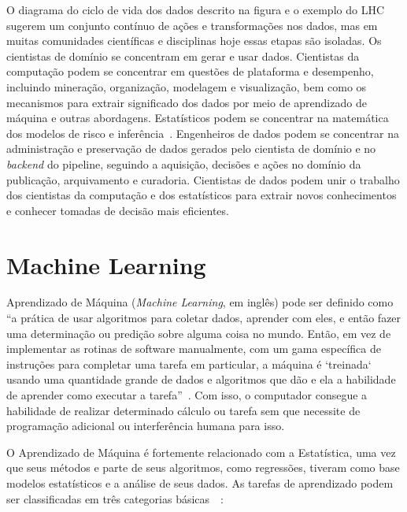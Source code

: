 \documentclass[portugues]{ic-tese}
\begin{document}
O diagrama do ciclo de vida dos dados descrito na figura e o exemplo do LHC sugerem um conjunto contínuo de ações e transformações nos dados, mas em muitas comunidades científicas e disciplinas hoje essas etapas são isoladas. Os cientistas de domínio se concentram em gerar e usar dados. Cientistas da computação podem se concentrar em questões de plataforma e desempenho, incluindo mineração, organização, modelagem e visualização, bem como os mecanismos para extrair significado dos dados por meio de aprendizado de máquina e outras abordagens. Estatísticos podem se concentrar na matemática dos modelos de risco e inferência~\citep{Berman_2018}. Engenheiros de dados podem se concentrar na administração e preservação de dados gerados pelo cientista de domínio e no \textit{backend} do pipeline, seguindo a aquisição, decisões e ações no domínio da publicação, arquivamento e curadoria. Cientistas de dados podem unir o trabalho dos cientistas da computação e dos estatísticos para extrair novos conhecimentos e conhecer tomadas de decisão mais eficientes.


\section{Machine Learning}
\label{sec:MachineLearning}

Aprendizado de Máquina (\textit{Machine Learning}, em inglês) pode ser definido como “a prática de usar algoritmos para coletar dados, aprender com eles, e então fazer uma determinação ou predição sobre alguma coisa no mundo. Então, em vez de implementar as rotinas de software manualmente, com um gama específica de instruções para completar uma tarefa em particular, a máquina é `treinada` usando uma quantidade grande de dados e algoritmos que dão e ela a habilidade de aprender como executar a tarefa”~\citep{Copeland_2016}. Com isso, o computador consegue a habilidade de realizar determinado cálculo ou tarefa sem que necessite de programação adicional ou interferência humana para isso.

O Aprendizado de Máquina é fortemente relacionado com a Estatística, uma vez que seus métodos e parte de seus algoritmos, como regressões, tiveram como base modelos estatísticos e a análise de seus dados. As tarefas de aprendizado podem ser classificadas em três categorias básicas~\citep{MLWikipedia_2021}~\citep{MLSAS_2021}:
\end{document}
